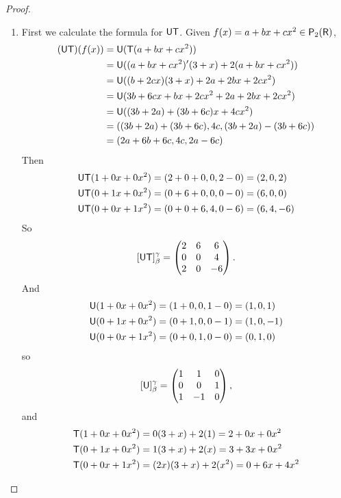 \begin{proof} \ 
\begin{enumerate}
\item
First we calculate the formula for \(\textsf{U}\textsf{T}\).
Given \(f(x) = a + bx + cx^2 \in \textsf{P}_2(\textsf{R})\),
\begin{align*}
    (\textsf{U}\textsf{T})(f(x)) & = \textsf{U}(\textsf{T}(a + bx + cx^2)) \\
                 & = \textsf{U}((a + bx + cx^2)'(3 + x) + 2(a + bx + cx^2)) \\
                 & = \textsf{U}((b + 2cx)(3 + x) + 2a + 2bx + 2cx^2) \\
                 & = \textsf{U}(3b + 6cx + bx + 2cx^2 + 2a + 2bx + 2cx^2) \\
                 & = \textsf{U}((3b + 2a) + (3b + 6c)x + 4cx^2) \\
                 & = ((3b + 2a) + (3b + 6c), 4c, (3b + 2a) - (3b + 6c)) \\
                 & = (2a + 6b + 6c, 4c, 2a - 6c)
\end{align*}
Then
\begin{align*}
    \textsf{U}\textsf{T}(1 + 0x + 0x^2) & = (2 + 0 + 0, 0, 2 - 0) = (2, 0, 2) \\
    \textsf{U}\textsf{T}(0 + 1x + 0x^2) & = (0 + 6 + 0, 0, 0 - 0) = (6, 0, 0) \\
    \textsf{U}\textsf{T}(0 + 0x + 1x^2) & = (0 + 0 + 6, 4, 0 - 6) = (6, 4, -6)
\end{align*}
So
\[
    [\textsf{U}\textsf{T}]_{\beta}^{\gamma} = \begin{pmatrix} 2 & 6 & 6 \\ 0 & 0 & 4 \\ 2 & 0 & -6 \end{pmatrix}.
\]
And
\begin{align*}
    \textsf{U}(1 + 0x + 0x^2) & = (1 + 0, 0, 1 - 0) = (1, 0, 1) \\
    \textsf{U}(0 + 1x + 0x^2) & = (0 + 1, 0, 0 - 1) = (1, 0, -1) \\
    \textsf{U}(0 + 0x + 1x^2) & = (0 + 0, 1, 0 - 0) = (0, 1, 0)
\end{align*}
so
\[
    [\textsf{U}]_{\beta}^{\gamma} = \begin{pmatrix} 1 & 1 & 0 \\ 0 & 0 & 1 \\ 1 & -1 & 0 \end{pmatrix},
\]
and
\begin{align*}
    \T(1 + 0x + 0x^2) & = 0(3 + x) + 2(1) = 2 + 0x + 0x^2 \\
    \T(0 + 1x + 0x^2) & = 1(3 + x) + 2(x) = 3 + 3x + 0x^2 \\
    \T(0 + 0x + 1x^2) & = (2x)(3 + x) + 2(x^2) = 0 + 6x + 4x^2

\end{align*}
\end{enumerate}
\end{proof}
